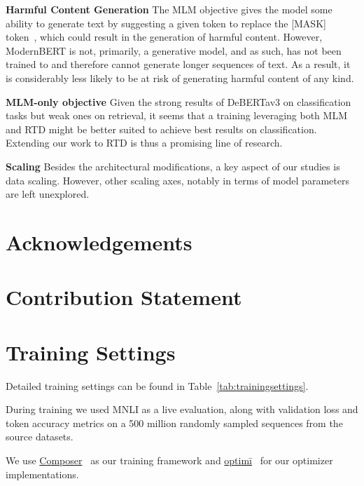\documentclass[11pt]{article}
\begin{document}
\textbf{Harmful Content Generation} The MLM objective gives the model some ability to generate text by suggesting a given token to replace the [MASK] token~\cite{berticl}, which could result in the generation of harmful content. However, ModernBERT is not, primarily, a generative model, and as such, has not been trained to and therefore cannot generate longer sequences of text. As a result, it is considerably less likely to be at risk of generating harmful content of any kind.

\textbf{MLM-only objective}
Given the strong results of DeBERTav3 on classification tasks but weak ones on retrieval, it seems that a training leveraging both MLM and RTD might be better suited to achieve best results on classification. Extending our work to RTD is thus a promising line of research.

\textbf{Scaling}
Besides the architectural modifications, a key aspect of our studies is data scaling. However, other scaling axes, notably in terms of model parameters are left unexplored.

\section{Acknowledgements}


\section{Contribution Statement}




\appendix

\section{Training Settings}
\label{app:trainingsettings}

Detailed training settings can be found in Table~\ref{tab:trainingsettings}.

During training we used MNLI as a live evaluation, along with validation loss and token accuracy metrics on a 500 million randomly sampled sequences from the source datasets. 

We use \href{https://github.com/composer/composer}{Composer}~\cite{composer} as our training framework and 
\href{https://github.com/search?q=optimi&type=repositories}{optimī}~\cite{optimi} for our optimizer implementations.

\end{document}
